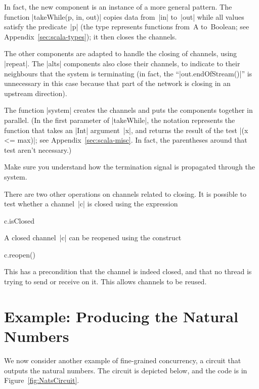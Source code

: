 
In fact, the new component is an instance of a more general pattern.  The
function |takeWhile(p, in, out)| copies data from~|in| to~|out| while all
values satisfy the predicate~|p| (the type \protect{}
represents functions from~{\scalashape A} to~{\scalashape Boolean}; see
Appendix~\ref{sec:scala-types}); it then closes the channels.

The other components are adapted to handle the closing of channels, using
|repeat|.  The |alts| components also close their channels, to indicate to
their neighbours that the system is terminating (in fact, the
``|out.endOfStream()|'' is unnecessary in this case because that part of the
network is closing in an upstream direction). 

The function |system| creates the channels and puts the components together in
parallel.  (In the first parameter of |takeWhile|, the notation  represents the function that takes an |Int|
argument~|x|, and returns the result of the test |(x <= max)|; see
Appendix~\ref{sec:scala-misc}.  In fact, the parentheses around that test
aren't necessary.)

\begin{instruction}
Make sure you understand how the termination signal is propagated through the
system. 
\end{instruction}

There are two other operations on channels related to closing. 
It is possible to test whether a channel~|c| is closed using the expression
%
\begin{scala}
  c.isClosed
\end{scala}
%
A closed channel~|c| can be reopened using the construct
\begin{scala}
  c.reopen()
\end{scala}
%
This has a precondition that the channel is indeed closed, and that no thread
is trying to send or receive on it.  This allows channels to be reused.



\section{Example: Producing the Natural Numbers}

We now consider another example of fine-grained concurrency, a circuit that
outputs the natural numbers.  The circuit is depicted below, and the code is
in Figure~\ref{fig:NatsCircuit}. 

